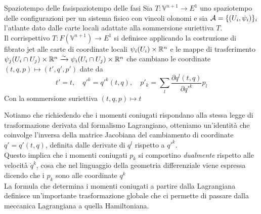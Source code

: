 \documentclass[openany]{book}
\renewcommand\A{\mc{A}}
\renewcommand\V{\mathbb{V}}
\begin{document}
\begin{definition}{Spaziotempo delle fasi}{spaziotempo delle fasi}
    Sia $T:\V^{n+1}\to E^1$ uno spaziotempo delle configurazioni per un sistema fisico con vincoli olonomi e sia $\A = \{ (U_i,\psi_i) \}_i$ l'atlante dato dalle carte locali adattate alla sommersione suriettiva $T$.\\
    Il corrispettivo  $T:F(\V^{n+1})\to E^1$ si definisce applicando la costruzione di fibrato jet alle carte di coordinate locali $\psi_i(U_i)\times\mathbb{R}^n$ e le mappe di trasferimento $\psi_j(U_i\cap U_j)\times \mathbb{R}^n \xrightarrow{\sim} \psi_i(U_i\cap U_j)\times \mathbb{R}^n$ che cambiano le coordinate $(t,q,p)\mapsto (t',q',p')$ date da 
    \[ t'=t,\quad q'^k=q'^k(t,q),\quad p'_k = \sum_l \frac{\partial q^l(t,q)}{\partial q'^k}p_l  \]
    Con la sommersione suriettiva $(t,q,p)\mapsto t$
\end{definition}

Notiamo che richiedendo che i momenti coniugati rispondano alla stessa legge di trasformazione derivata dal formalismo Lagrangiano, otteniamo un'identità che coinvolge l'inversa della matrice Jacobiana del cambiamento di coordinate $q'=q'(t,q)$, definita dalle derivate di $q^l$ rispetto a $q'^k$.\\
Questo implica che i momenti coniugati $p_k$ si comportino \textit{dualmente} rispetto alle velocità $\dot q^k$, cosa che nel linguaggio della geometria differenziale viene espressa dicendo che i $p_k$ sono  alle coordinate $q^k$\\
La formula che determina i momenti coniugati a partire dalla Lagrangiana definisce un'importante trasformazione globale che ci permette di passare dalla meccanica Lagrangiana a quella Hamiltoniana.
\end{document}
